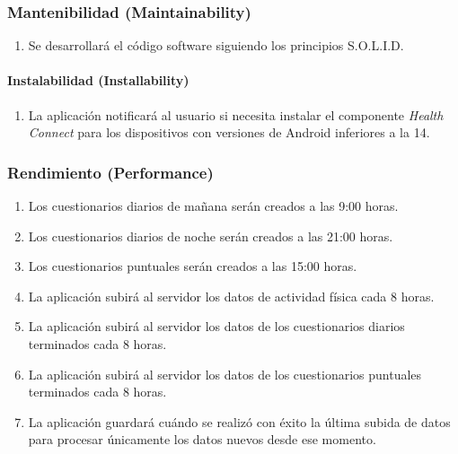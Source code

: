         \subsubsection{Mantenibilidad (Maintainability)}
            \begin{enumerate}[resume, label=\textbf{\texttt{RNF-\arabic*}}]
                \item Se desarrollará el código software siguiendo los principios S.O.L.I.D.
            \end{enumerate}
            \paragraph{Instalabilidad (Installability)}
                \begin{enumerate}[resume, label=\textbf{\texttt{RNF-\arabic*}}]
                    \item La aplicación notificará al usuario si necesita instalar el componente \textit{Health Connect} para los dispositivos con versiones de Android inferiores a la 14.
                \end{enumerate}
        \subsubsection{Rendimiento (Performance)}
            \begin{enumerate}[resume, label=\textbf{\texttt{RNF-\arabic*}}]
                \item Los cuestionarios diarios de mañana serán creados a las 9:00 horas.
                \item Los cuestionarios diarios de noche serán creados a las 21:00 horas.
                \item Los cuestionarios puntuales serán creados a las 15:00 horas.
                \item La aplicación subirá al servidor los datos de actividad física cada 8 horas.
                \item La aplicación subirá al servidor los datos de los cuestionarios diarios terminados cada 8 horas.
                \item La aplicación subirá al servidor los datos de los cuestionarios puntuales terminados cada 8 horas.
                \item La aplicación guardará cuándo se realizó con éxito la última subida de datos para procesar únicamente los datos nuevos desde ese momento.
            \end{enumerate}
